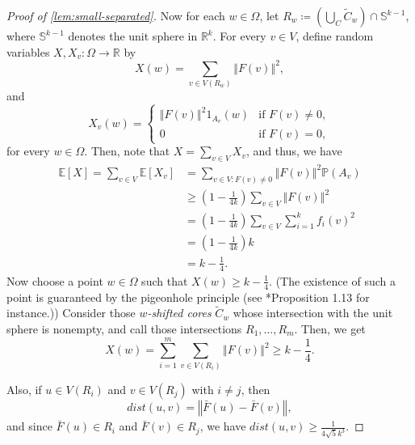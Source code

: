\documentclass[12pt,a4paper,bold]{thesis}
\theoremstyle{definition}
\newcommand*{\map}[3]{#1 \colon #2 \to #3}
\newcommand*{\norm}[2][]{\left\Vert #2 \right\Vert_{#1}}
\begin{document}
\begin{proof}[Proof of \cref{lem:small-separated}]
    Now for each $w \in \Omega$, let $R_w \coloneq \left(\bigcup_{C} \tilde C_w\right) 
    \cap \mathbb{S}^{k-1}$, where $\mathbb{S}^{k-1}$ denotes the unit sphere 
    in $\mathbb{R}^k$. For every $v \in V$, define random variables 
    $\map{X, X_v}{\Omega}{\mathbb{R}}$ by
    \begin{equation*}
        X(w) = \sum_{v \in V(R_w)} \norm{F(v)}^2, 
    \end{equation*}
    and
    \begin{equation*}
        X_v(w) = \begin{cases}
            \norm{F(v)}^2 1_{A_v}(w) 
            & \text{if } F(v) \neq 0,
            \\
            0
            & \text{if } F(v) = 0,
        \end{cases}
    \end{equation*}
    for every $w \in \Omega$. Then, note that $X = \sum_{v \in V} X_v$, and thus,
    we have
    \begin{align*}
        \mathbb{E}[X] = \sum_{v \in V} \mathbb{E}[X_v]
        & =
        \sum_{v \in V : F(v) \neq 0} \norm{F(v)}^2 \mathbb{P}(A_v)
        \\
        & \geq
        \left(1 - \frac{1}{4k}\right) \sum_{v \in V} \norm{F(v)}^2
        \\
        & =
        \left(1 - \frac{1}{4k}\right) \sum_{v \in V} \sum_{i=1}^k f_i(v)^2
        \\
        & =
        \left(1 - \frac{1}{4k}\right) k
        \\
        & =
        k - \frac{1}{4}.
    \end{align*}
    Now choose a point $w \in \Omega$ such that $X(w) \geq k - \frac{1}{4}$.
    (The existence of such a point is guaranteed by the pigeonhole principle
    (see \cite{Prendiville-Fourier-in-Ramsey}*{Proposition 1.13} for instance.))
    Consider those \emph{$w$-shifted cores} $\tilde C_w$ whose intersection 
    with the unit sphere is nonempty, and call those intersections $R_1, \dots, R_m$. 
    Then, we get
    \begin{equation*}
        X(w) = \sum_{i=1}^{m} \sum_{v \in V(R_i)} \norm{F(v)}^2 \geq k - \frac{1}{4}.
    \end{equation*}

    Also, if $u \in V(R_i)$ and $v \in V(R_j)$ with $i \neq j$, then
	\begin{equation*}
		dist(u,v) = \norm{\bar{F}(u) - \bar{F}(v)}, 
	\end{equation*} 
	and since $\bar{F}(u) \in R_i$ and $\bar{F}(v) \in R_j$,
    we have $dist(u,v) \geq \frac{1}{4\sqrt{5}k^3}$.


\end{proof}
\end{document}
